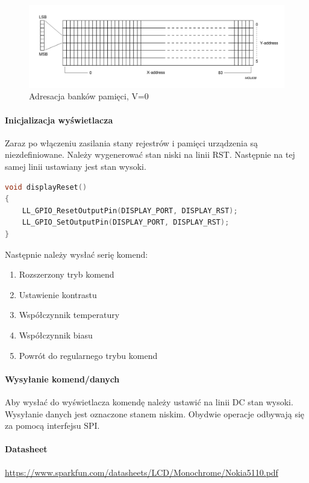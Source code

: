 \documentclass{article}
\begin{document}
\begin{figure}[ht]
    \includegraphics[scale=0.50]{address_display}
    \caption{Adresacja banków pamięci, V=0}
\end{figure}

\paragraph{Inicjalizacja wyświetlacza}
Zaraz po włączeniu zasilania stany rejestrów i pamięci urządzenia są niezdefiniowane.
Należy wygenerować stan niski na linii RST. Następnie na tej samej linii ustawiany
jest stan wysoki.

\begin{center}
\begin{lstlisting}[language=C, basicstyle=\footnotesize]
void displayReset()
{
    LL_GPIO_ResetOutputPin(DISPLAY_PORT, DISPLAY_RST);
    LL_GPIO_SetOutputPin(DISPLAY_PORT, DISPLAY_RST);
} 
\end{lstlisting}
\end{center}

Następnie należy wysłać serię komend:

\begin{enumerate}
    \item Rozszerzony tryb komend
    \item Ustawienie kontrastu
    \item Współczynnik temperatury
    \item Współczynnik biasu
    \item Powrót do regularnego trybu komend
\end{enumerate}


\paragraph{Wysyłanie komend/danych}
Aby wysłać do wyświetlacza komendę należy ustawić na linii DC stan wysoki. Wysyłanie danych
jest oznaczone stanem niskim. Obydwie operacje odbywają się za pomocą interfejsu SPI.
\paragraph{Datasheet}
\url{https://www.sparkfun.com/datasheets/LCD/Monochrome/Nokia5110.pdf}
\end{document}

